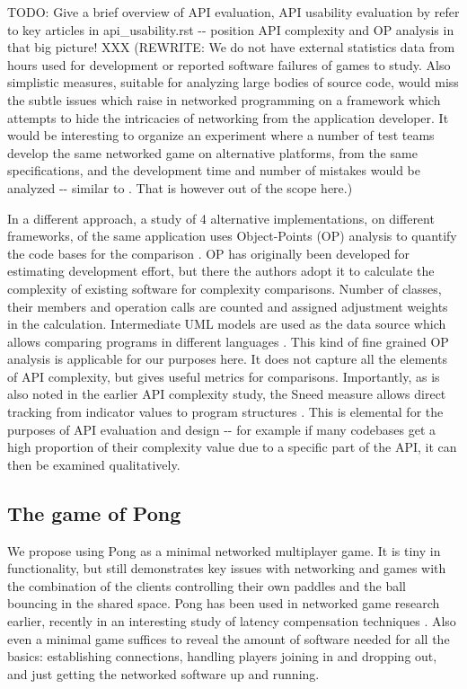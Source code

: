 \documentclass[conference]{IEEEtran}
\begin{document}
TODO: Give a brief overview of API evaluation, API usability
evaluation by refer to key articles in api\_usability.rst -{}- position
API complexity and OP analysis in that big picture! XXX
(REWRITE: We do not have external statistics data from hours used for
development or reported software failures of games to study. Also
simplistic measures, suitable for analyzing large bodies of source
code, would miss the subtle issues which raise in networked
programming on a framework which attempts to hide the intricacies of
networking from the application developer. It would be interesting to
organize an experiment where a number of test teams develop the same
networked game on alternative platforms, from the same specifications,
and the development time and number of mistakes would be analyzed -{}-
similar to \cite{programmingcomparison}. That is however out of the scope
here.)

In a different approach, a study of 4 alternative implementations, on
different frameworks, of the same application uses Object-Points (OP)
analysis to quantify the code bases for the comparison
\cite{api-complexity-analysis}. OP has originally been developed for
estimating development effort, but there the authors adopt it to
calculate the complexity of existing software for complexity
comparisons. Number of classes, their members and operation calls are
counted and assigned adjustment weights in the
calculation. Intermediate UML models are used as the data source which
allows comparing programs in different languages
\cite{api-complexity-analysis}. This kind of fine grained OP analysis is
applicable for our purposes here. It does not capture all the elements
of API complexity, but gives useful metrics for
comparisons. Importantly, as is also noted in the earlier API
complexity study, the Sneed measure allows direct tracking from
indicator values to program structures
\cite{api-complexity-analysis}. This is elemental for the purposes of API
evaluation and design -{}- for example if many codebases get a high
proportion of their complexity value due to a specific part of the
API, it can then be examined qualitatively.


\subsection{The game of Pong%
  \label{the-game-of-pong}%
}

We propose using Pong as a minimal networked multiplayer game. It is
tiny in functionality, but still demonstrates key issues with
networking and games with the combination of the clients controlling
their own paddles and the ball bouncing in the shared space. Pong has
been used in networked game research earlier, recently in an
interesting study of latency compensation techniques
\cite{pong-ping}. Also even a minimal game suffices to reveal the amount
of software needed for all the basics: establishing connections,
handling players joining in and dropping out, and just getting the
networked software up and running.
\end{document}
